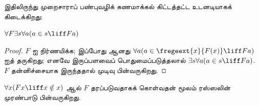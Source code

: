 \documentclass[../../../include/open-logic-section]{subfiles}
\begin{document}
இதிலிருந்து முறைசாராப் பண்புவழிக் கணமாக்கல் கிட்டத்தட்ட உடனடியாகக்
கிடைக்கிறது:

\begin{lem}
$\forall F \exists s \forall a (a \in s \liff Fa)$
\end{lem}

\begin{proof}
$F$ ஐ நிர்ணயிக்க; இப்போது  ஆனது
$\forall a (a \in \fregeext{x}{F(x)} \liff Fa)$ ஐத் தருகிறது; எனவே
இருப்பளவைப் பொதுமைப்படுத்தலால் $\exists s\forall a(a \in s \liff Fa)$.
$F$ தன்னிச்சையாக இருந்ததால் முடிவு பின்வருகிறது.
\end{proof}

$\forall x(Fx \liff x \notin x)$ ஆல் $F$ தரப்படுவதாகக் கொள்வதன் மூலம்
ரஸ்ஸலின் முரண்பாடு பின்வருகிறது.
\end{document}
